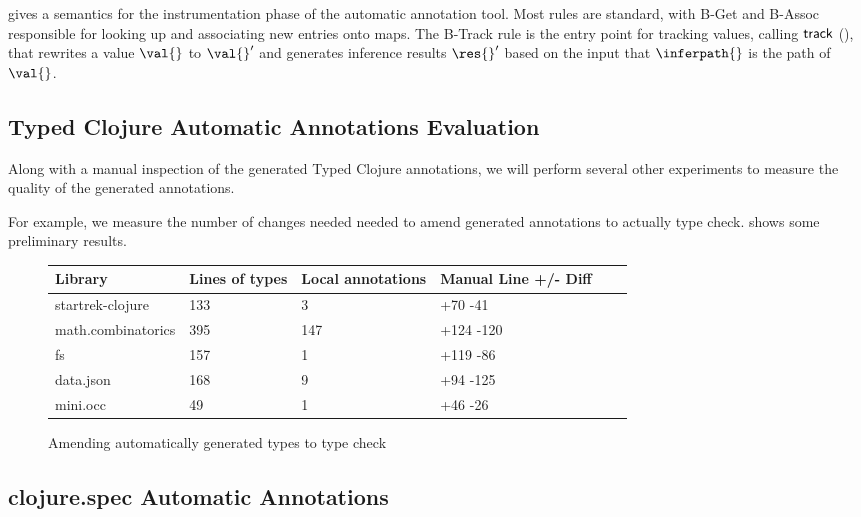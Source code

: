 \documentclass[9pt]{extarticle}
\begin{document}
 gives a semantics for the instrumentation
phase of the automatic annotation tool.
Most rules are standard, with B-Get and B-Assoc responsible for
looking up and associating new entries onto maps.
The B-Track rule is the entry point for tracking values,
calling $\mathsf{track}{}$ (), that
rewrites a value $\val{}$ to $\val{}'$ and generates inference
results $\res{}'$ based on the input that $\inferpath{}$
is the path of $\val{}$.





\subsection{Typed Clojure Automatic Annotations Evaluation}

Along with a manual inspection of the generated Typed Clojure annotations,
we will perform several other experiments to measure the quality of the
generated annotations.

For example, we measure the number of changes needed
needed to amend generated annotations to actually type check.
 shows some preliminary results.

\begin{figure*}
\begin{tabular}{| l | l | l | l | l | l |}
  Library            & Lines of types  & Local annotations & Manual Line +/- Diff \\
  \hline
  startrek-clojure   & 133             & 3                 & +70 -41 \\
  math.combinatorics & 395             & 147               & +124 -120\\
  fs                 & 157             & 1                 & +119 -86\\
  data.json          & 168             & 9                 & +94 -125 \\
  mini.occ           & 49              & 1                 & +46 -26\\
\end{tabular}
\caption{Amending automatically generated types to type check}
  \label{infer:amending}
\end{figure*}

\subsection{clojure.spec Automatic Annotations}
\end{document}
